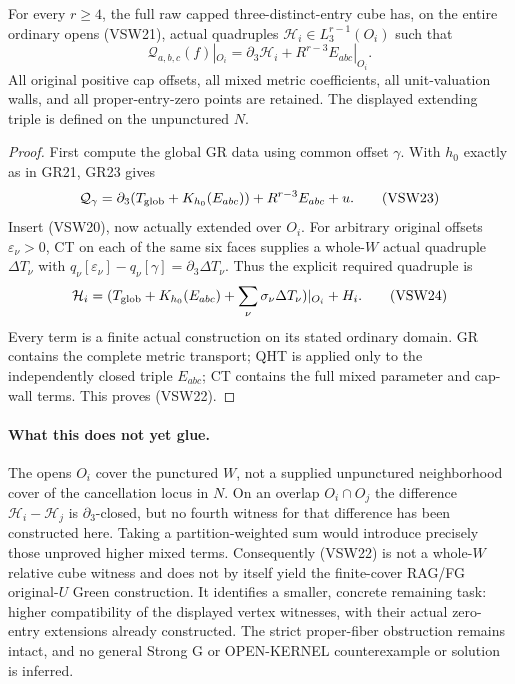 \begin{theorem}
For every $r\ge4$, the full raw capped three-distinct-entry cube
has, on the entire ordinary opens (VSW21), actual quadruples
$\mathcal H_i\in L_3^{r-1}(O_i)$ such that
\[
       \mathcal Q_{a,b,c}(f)|_{O_i}
             =\partial_3\mathcal H_i+R^{r-3}E_{abc}|_{O_i}.
 \tag{VSW22}
\]
All original positive cap offsets, all mixed metric coefficients,
all unit-valuation walls, and all proper-entry-zero points are
retained.  The displayed extending triple is defined on the
unpunctured $N$.
\end{theorem}

\begin{proof}
First compute the global GR data using common offset $\gamma$.
With $h_0$ exactly as in GR21, GR23 gives
\[
 \mathcal Q_\gamma
       =\partial_3(T_{\rm glob}+K_{h_0}(E_{abc}))
                         +R^{r-3}E_{abc}+u.
 \tag{VSW23}
\]
Insert (VSW20), now actually extended over $O_i$.
For arbitrary original offsets $\varepsilon_\nu>0$, CT on
each of the same six faces supplies a whole-$W$ actual quadruple
$\Delta T_\nu$ with
$q_\nu[\varepsilon_\nu]-q_\nu[\gamma]
=\partial_3\Delta T_\nu$.
Thus the explicit required quadruple is
\[
 \mathcal H_i=
  (T_{\rm glob}+K_{h_0}(E_{abc})
                 +\sum_\nu\sigma_\nu\Delta T_\nu)|_{O_i}+H_i.
 \tag{VSW24}
\]
Every term is a finite actual construction on its stated ordinary
domain.  GR contains the complete metric transport; QHT is applied
only to the independently closed triple $E_{abc}$; CT contains
the full mixed parameter and cap-wall terms.  This proves (VSW22).
\end{proof}

\paragraph{What this does not yet glue.}
The opens $O_i$ cover the punctured $W$, not a supplied unpunctured
neighborhood cover of the cancellation locus in $N$.  On an overlap
$O_i\cap O_j$ the difference $\mathcal H_i-\mathcal H_j$ is
$\partial_3$-closed, but no fourth witness for that difference has
been constructed here.  Taking a partition-weighted sum would
introduce precisely those unproved higher mixed terms.
Consequently (VSW22) is not a whole-$W$ relative cube witness and
does not by itself yield the finite-cover RAG/FG original-$U$
Green construction.  It identifies a smaller, concrete remaining
task: higher compatibility of the displayed vertex witnesses,
with their actual zero-entry extensions already constructed.
The strict proper-fiber obstruction remains intact, and no general
Strong G or OPEN-KERNEL counterexample or solution is inferred.

